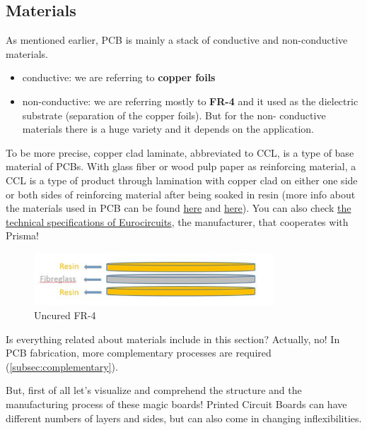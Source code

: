 \documentclass[final]{cubedoc}
\begin{document}
	\subsection{Materials}
	
	As mentioned earlier, PCB is mainly a stack of conductive and non-conductive materials.
	
	\begin{itemize}
		\item conductive: we are referring to \textbf{copper foils}
		\item non-conductive: we are referring mostly to \textbf{FR-4} and it used as the dielectric substrate (separation of the copper foils). But for the non- conductive materials there is a huge variety and it depends on the application.
	\end{itemize}
	
	To be more precise, copper clad laminate, abbreviated to CCL, is a type of base material of PCBs. With glass fiber or wood pulp paper as reinforcing material, a CCL is a type of product through lamination with copper clad on either one side or both sides of reinforcing material after being soaked in resin (more info about the materials used in PCB can be found \href{https://www.pcbcart.com/article/content/copper-clad-laminate.html}{here} and \href{https://www.pcbcart.com/pcb-capability/pcb-materials.html}{here}). You can also check \href{https://www.eurocircuits.com/technical-specifications-of-all-eurocircuits-prototype-small-volume-services-european-origin/}{the technical specifications of Eurocircuits}, the manufacturer, that cooperates with Prisma!
	
	\begin{figure}[h]
		\centering
		\includegraphics[width=0.8\textwidth,height=0.8\textheight,keepaspectratio]{assets/fiberglass_resin.png}
		\caption{Uncured FR-4}
	\end{figure}
	
	Is everything related about materials include in this section? Actually, no! In PCB fabrication, more complementary processes are required (\autoref{subsec:complementary}).
	
	But, first of all let’s visualize and comprehend the structure and the manufacturing process of these magic boards! Printed Circuit Boards can have different numbers of layers and sides, but can also come in changing inflexibilities. 
	
\end{document}
